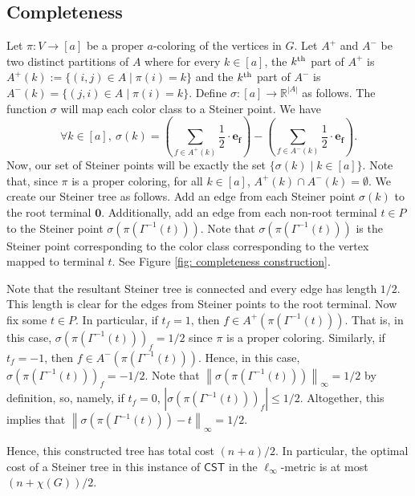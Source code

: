 \documentclass{article}\providecommand{\DeclareRedundantLanguages}[2]{}\usepackage[a4paper,margin=20mm]{geometry}
\newcommand{\R}{\mathbb{R}}
\newcommand{\1}{\textbf{1}}
\newcommand{\norm}[1]{\left\lVert#1\right\rVert}
\newcommand{\cst}{$\mathsf{CST}$\xspace}
\begin{document}
\subsection{Completeness} \label{sec: l_inf completeness}
Let $\pi: V \to [a]$ be a proper $a$-coloring of the vertices in $G$. Let $A^+$ and $A^-$ be two distinct partitions of $A$ where for every  $k\in[a]$, the $k\textsuperscript{th} $ part of $A^+$ is $A^+(k):=  \{(i,j) \in A\mid \pi(i)=k\}$ and the $k\textsuperscript{th} $ part of $A^-$ is  $A^-(k) =  \{(j,i) \in A\mid \pi(i)=k\}$. Define $\sigma : [a] \to \R^{|A|}$ as follows. The function $\sigma$ will map each color class to a Steiner point. We have 
\[\forall k\in[a],\  
\sigma(k) = \left(\sum_{f \in A^+(k)} \frac{1}{2} \cdot \mathbf{e_{f}}\right) - \left(\sum_{f \in A^-(k)}\frac{1}{2} \cdot \mathbf{e_{f}}\right).
\]
Now, our set of Steiner points will be exactly the set 
$\{\sigma(k)\mid k\in [a]\}$. Note that, since $\pi$ is a proper coloring, for all $k \in [a]$, $A^+(k) \cap A^-(k) = \emptyset$. We create our Steiner tree as follows. Add an edge from each Steiner point $\sigma(k)$ to the root terminal $\mathbf{0}$. Additionally, add an edge from each non-root terminal $t \in P$ to the Steiner point $\sigma(\pi(\Gamma^{-1}(t)))$. Note that $\sigma(\pi(\Gamma^{-1}(t)))$ is the Steiner point corresponding to the color class corresponding to the vertex mapped to terminal $t$. See Figure \ref{fig: completeness construction}.

Note that the resultant Steiner tree is connected and every edge has length $1/2$. This length is clear for the edges from Steiner points to the root terminal. Now fix some $t \in P$. In particular, if $t_f = 1$, then $f \in A^+(\pi(\Gamma^{-1}(t))).$ That is, in this case, $\sigma(\pi(\Gamma^{-1}(t)))_f = 1/2$ since $\pi$ is a proper coloring. Similarly, if $t_f = -1$, then $f \in A^-(\pi(\Gamma^{-1}(t)))$. Hence, in this case, $\sigma(\pi(\Gamma^{-1}(t)))_f = -1/2$.  Note that $\norm{\sigma(\pi(\Gamma^{-1}(t)))}_{\infty} = 1/2$ by definition, so, namely, if $t_f = 0$, $|\sigma(\pi(\Gamma^{-1}(t)))_f| \leq 1/2$. Altogether, this implies that $\norm{\sigma(\pi(\Gamma^{-1}(t))) - t}_{\infty} = 1/2$.

Hence, this constructed tree has total cost $(n + a)/2$. In particular, the optimal cost of a Steiner tree in this instance of \cst in the $\ell_{\infty}$-metric is at most $(n + \chi(G))/2$.
\end{document}

